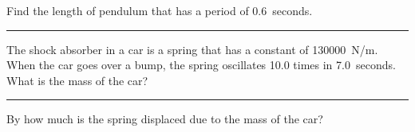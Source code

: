 \documentclass[12pt]{exam}
\begin{document}
\begin{questions}

\Large


\question Find the length of pendulum that has a period of 0.6~seconds.

\vs \hrule \vs

\question The shock absorber in a car is a spring that has a constant of \SI{130000}{N/m}.  When the car goes over a bump, the spring oscillates 10.0 times in 7.0~seconds.  What is the mass of the car? \vs

\vs \hrule \vs

\question By how much is the spring displaced due to the mass of the car?

\vs



\end{questions}
\end{document}
